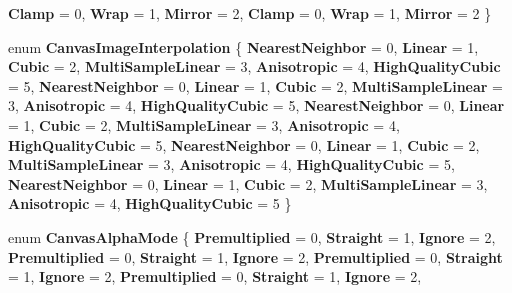 \begin{DoxyCompactItemize}
{\bfseries Clamp} = 0, 
{\bfseries Wrap} = 1, 
{\bfseries Mirror} = 2, 
\newline
{\bfseries Clamp} = 0, 
{\bfseries Wrap} = 1, 
{\bfseries Mirror} = 2
 \}
\item 
\mbox{\label{namespace_microsoft_1_1_graphics_1_1_canvas_abc4f24be9a610e40780a91ad57c2e1c3}} 
enum {\bfseries Canvas\+Image\+Interpolation} \{ \newline
{\bfseries Nearest\+Neighbor} = 0, 
{\bfseries Linear} = 1, 
{\bfseries Cubic} = 2, 
{\bfseries Multi\+Sample\+Linear} = 3, 
\newline
{\bfseries Anisotropic} = 4, 
{\bfseries High\+Quality\+Cubic} = 5, 
{\bfseries Nearest\+Neighbor} = 0, 
{\bfseries Linear} = 1, 
\newline
{\bfseries Cubic} = 2, 
{\bfseries Multi\+Sample\+Linear} = 3, 
{\bfseries Anisotropic} = 4, 
{\bfseries High\+Quality\+Cubic} = 5, 
\newline
{\bfseries Nearest\+Neighbor} = 0, 
{\bfseries Linear} = 1, 
{\bfseries Cubic} = 2, 
{\bfseries Multi\+Sample\+Linear} = 3, 
\newline
{\bfseries Anisotropic} = 4, 
{\bfseries High\+Quality\+Cubic} = 5, 
{\bfseries Nearest\+Neighbor} = 0, 
{\bfseries Linear} = 1, 
\newline
{\bfseries Cubic} = 2, 
{\bfseries Multi\+Sample\+Linear} = 3, 
{\bfseries Anisotropic} = 4, 
{\bfseries High\+Quality\+Cubic} = 5, 
\newline
{\bfseries Nearest\+Neighbor} = 0, 
{\bfseries Linear} = 1, 
{\bfseries Cubic} = 2, 
{\bfseries Multi\+Sample\+Linear} = 3, 
\newline
{\bfseries Anisotropic} = 4, 
{\bfseries High\+Quality\+Cubic} = 5
 \}
\item 
\mbox{\label{namespace_microsoft_1_1_graphics_1_1_canvas_a1ab747c729197befb5d2c28b22e08bc3}} 
enum {\bfseries Canvas\+Alpha\+Mode} \{ \newline
{\bfseries Premultiplied} = 0, 
{\bfseries Straight} = 1, 
{\bfseries Ignore} = 2, 
{\bfseries Premultiplied} = 0, 
\newline
{\bfseries Straight} = 1, 
{\bfseries Ignore} = 2, 
{\bfseries Premultiplied} = 0, 
{\bfseries Straight} = 1, 
\newline
{\bfseries Ignore} = 2, 
{\bfseries Premultiplied} = 0, 
{\bfseries Straight} = 1, 
{\bfseries Ignore} = 2, 
\newline

\end{DoxyCompactItemize}
